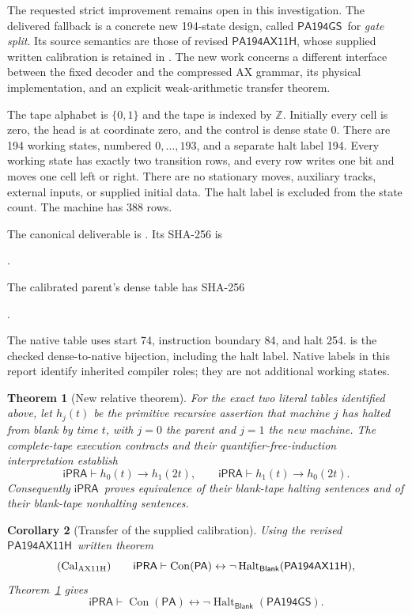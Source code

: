 \documentclass[10pt,a4paper]{article}
\newcommand{\iPRA}{\ensuremath{\mathsf{iPRA}}}
\newcommand{\PA}{\ensuremath{\mathsf{PA}}}
\newcommand{\Con}{\operatorname{Con}}
\newcommand{\Halt}{\operatorname{Halt}}
\newcommand{\Blank}{\mathsf{Blank}}
\newcommand{\GS}{\ensuremath{\mathsf{PA194GS}}}
\newcommand{\Parent}{\ensuremath{\mathsf{PA194AX11H}}}
\newtheorem{theorem}{Theorem}
\newtheorem{corollary}[theorem]{Corollary}
\theoremstyle{definition}
\begin{document}
The requested strict improvement remains open in this investigation. The
delivered fallback is a concrete new 194-state design, called \GS\ for
\emph{gate split}. Its source semantics are those of revised \Parent,
whose supplied written calibration is retained in
. The new work concerns a different
interface between the fixed decoder and the compressed AX grammar, its
physical implementation, and an explicit weak-arithmetic transfer theorem.

The tape alphabet is $\{0,1\}$ and the tape is indexed by $\mathbb Z$.
Initially every cell is zero, the head is at coordinate zero, and the
control is dense state 0. There are 194 working states, numbered
$0,\ldots,193$, and a separate halt label 194. Every working state has
exactly two transition rows, and every row writes one bit and moves one
cell left or right. There are no stationary moves, auxiliary tracks,
external inputs, or supplied initial data. The halt label is excluded
from the state count. The machine has 388 rows.

The canonical deliverable is . Its SHA-256 is
\begin{center}\small
{}.
\end{center}
The calibrated parent's dense table has SHA-256
\begin{center}\small
{}.
\end{center}
The native table uses start 74, instruction boundary 84, and halt 254.
 is the checked dense-to-native bijection,
including the halt label. Native labels in this report identify inherited
compiler roles; they are not additional working states.

\begin{theorem}[New relative theorem]
\label{thm:relative}
For the exact two literal tables identified above, let $h_j(t)$ be the
primitive recursive assertion that machine $j$ has halted from blank by
time $t$, with $j=0$ the parent and $j=1$ the new machine.
The complete-tape execution contracts and their quantifier-free-induction
interpretation establish
\[
 \iPRA\vdash h_0(t)\to h_1(2t),\qquad
 \iPRA\vdash h_1(t)\to h_0(2t).
\]
Consequently \iPRA\ proves equivalence of their blank-tape halting
sentences and of their blank-tape nonhalting sentences.
\end{theorem}

\begin{corollary}[Transfer of the supplied calibration]
\label{cor:calibration}
Using the revised \Parent\ written theorem
\[
 (\mathrm{Cal}_{\rm AX11H})\qquad
 \iPRA\vdash\Con(\PA)\leftrightarrow
                    \neg\Halt_{\Blank}(\Parent),
\]
Theorem~\ref{thm:relative} gives
\[
 \boxed{\iPRA\vdash\Con(\PA)\leftrightarrow
                    \neg\Halt_{\Blank}(\GS).}
\]
\end{corollary}
\end{document}
